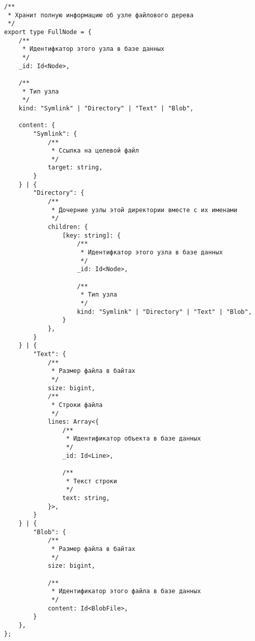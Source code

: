 \begin{verbatim}
/**
 * Хранит полную информацию об узле файлового дерева
 */
export type FullNode = {
    /**
     * Идентифкатор этого узла в базе данных
     */
    _id: Id<Node>,

    /**
     * Тип узла
     */
    kind: "Symlink" | "Directory" | "Text" | "Blob",

    content: {
        "Symlink": {
            /**
             * Ссылка на целевой файл
             */
            target: string,
        }
    } | {
        "Directory": {
            /**
             * Дочерние узлы этой директории вместе с их именами
             */
            children: {
                [key: string]: {
                    /**
                     * Идентифкатор этого узла в базе данных
                     */
                    _id: Id<Node>,
                    
                    /**
                     * Тип узла
                     */
                    kind: "Symlink" | "Directory" | "Text" | "Blob",
                }
            },
        }
    } | {
        "Text": {
            /**
             * Размер файла в байтах
             */
            size: bigint,
            /**
             * Строки файла
             */
            lines: Array<{
                /**
                 * Идентификатор объекта в базе данных
                 */
                _id: Id<Line>,
                
                /**
                 * Текст строки
                 */
                text: string,
            }>,
        }
    } | {
        "Blob": {
            /**
             * Размер файла в байтах
             */
            size: bigint,
            
            /**
             * Идентификатор этого файла в базе данных
             */
            content: Id<BlobFile>,
        }
    },
};
\end{verbatim}


\clearpage